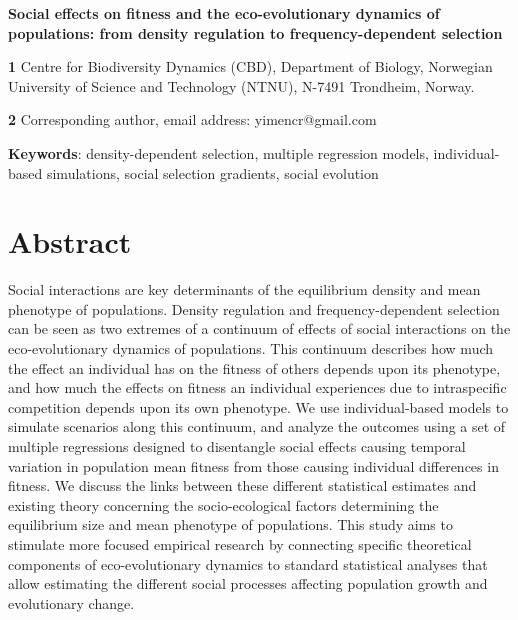 \documentclass{article}
\begin{document}
\begin{center}
\large
\textbf{Social effects on fitness and the eco-evolutionary dynamics of populations: from density regulation to frequency-dependent selection}
\end{center}


\bigskip
\textbf{1} Centre for Biodiversity Dynamics (CBD), Department of Biology, Norwegian University of Science and Technology (NTNU), N-7491 Trondheim, Norway.

\bigskip
\textbf{2} Corresponding author, email address: yimencr@gmail.com

\bigskip
\textbf{Keywords}: density-dependent selection, multiple regression models, individual-based simulations, social selection gradients, social evolution

\newpage
\section{Abstract}
Social interactions are key determinants of the equilibrium density and mean phenotype of populations. Density regulation and frequency-dependent selection can be seen as two extremes of a continuum of effects of social interactions on the eco-evolutionary dynamics of populations. This continuum  describes how much the effect an individual has on the fitness of others depends upon its phenotype, and how much the effects on fitness an individual experiences due to intraspecific competition depends upon its own phenotype. We use individual-based models to simulate scenarios along this continuum, and analyze the outcomes using a set of multiple regressions designed to disentangle social effects causing temporal variation in population mean fitness from those causing individual differences in fitness. We discuss the links between these different statistical estimates and existing theory concerning the socio-ecological factors determining the equilibrium size and mean phenotype of populations. This study aims to stimulate more focused empirical research by connecting specific theoretical components of eco-evolutionary dynamics to standard statistical analyses that allow estimating the different social processes affecting population growth and evolutionary change. 

\newpage
\end{document}
